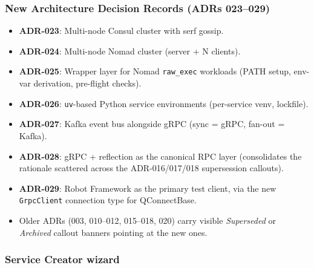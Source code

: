 \subsubsection{New Architecture Decision Records (ADRs 023--029)}

\begin{itemize}
   \item \textbf{ADR-023}: Multi-node Consul cluster with serf gossip.
   \item \textbf{ADR-024}: Multi-node Nomad cluster (server + N clients).
   \item \textbf{ADR-025}: Wrapper layer for Nomad \texttt{raw\_exec} workloads
         (PATH setup, env-var derivation, pre-flight checks).
   \item \textbf{ADR-026}: \texttt{uv}-based Python service environments
         (per-service venv, lockfile).
   \item \textbf{ADR-027}: Kafka event bus alongside gRPC (sync = gRPC,
         fan-out = Kafka).
   \item \textbf{ADR-028}: gRPC + reflection as the canonical RPC layer
         (consolidates the rationale scattered across the ADR-016/017/018
         supersession callouts).
   \item \textbf{ADR-029}: Robot Framework as the primary test client, via the
         new \texttt{GrpcClient} connection type for QConnectBase.
   \item Older ADRs (003, 010--012, 015--018, 020) carry visible
         \emph{Superseded} or \emph{Archived} callout banners pointing at the
         new ones.
\end{itemize}

\subsubsection{Service Creator wizard}

